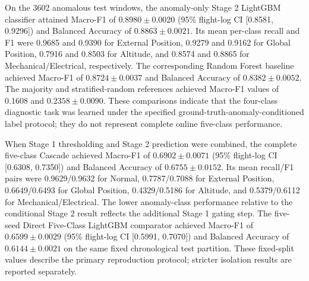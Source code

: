 On the 3602 anomalous test windows, the anomaly-only Stage 2 LightGBM classifier attained Macro-F1 of $0.8980 \pm 0.0020$ (95\% flight-log CI [0.8581, 0.9296]) and Balanced Accuracy of $0.8863 \pm 0.0021$. Its mean per-class recall and F1 were 0.9685 and 0.9390 for External Position, 0.9279 and 0.9162 for Global Position, 0.7916 and 0.8503 for Altitude, and 0.8574 and 0.8865 for Mechanical/Electrical, respectively. The corresponding Random Forest baseline achieved Macro-F1 of $0.8724 \pm 0.0037$ and Balanced Accuracy of $0.8382 \pm 0.0052$. The majority and stratified-random references achieved Macro-F1 values of 0.1608 and $0.2358 \pm 0.0090$. These comparisons indicate that the four-class diagnostic task was learned under the specified ground-truth-anomaly-conditioned label protocol; they do not represent complete online five-class performance.

When Stage 1 thresholding and Stage 2 prediction were combined, the complete five-class Cascade achieved Macro-F1 of $0.6902 \pm 0.0071$ (95\% flight-log CI [0.6308, 0.7350]) and Balanced Accuracy of $0.6755 \pm 0.0152$. Its mean recall/F1 pairs were 0.9629/0.9632 for Normal, 0.7787/0.7088 for External Position, 0.6649/0.6493 for Global Position, 0.4329/0.5186 for Altitude, and 0.5379/0.6112 for Mechanical/Electrical. The lower anomaly-class performance relative to the conditional Stage 2 result reflects the additional Stage 1 gating step. The five-seed Direct Five-Class LightGBM comparator achieved Macro-F1 of $0.6599 \pm 0.0029$ (95\% flight-log CI [0.5991, 0.7070]) and Balanced Accuracy of $0.6144 \pm 0.0021$ on the same fixed chronological test partition. These fixed-split values describe the primary reproduction protocol; stricter isolation results are reported separately.
